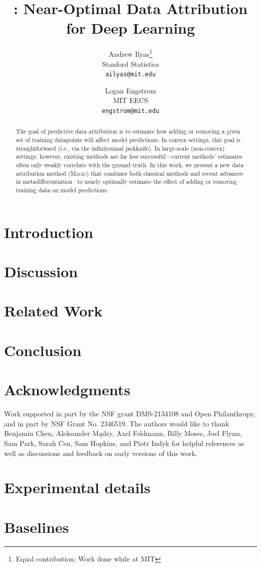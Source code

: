 \documentclass[11pt]{article}
\title{\method{}: Near-Optimal Data Attribution for Deep Learning}
\author{Andrew Ilyas\footnote{Equal contribution; Work done while at MIT} \\
  Stanford Statistics \\ 
  \texttt{ailyas@mit.edu} \and
  Logan Engstrom\footnotemark[1] \\
  MIT EECS \\
  \texttt{engstrom@mit.edu}
}
\date{}
\newcommand{\method}{\textsc{Magic}}
\begin{document}
\maketitle

\begin{abstract}
  The goal of predictive data attribution is to estimate how adding or removing
  a given set of training datapoints will affect model predictions.
  In convex settings, this goal is straightforward (i.e., via the infinitesimal
  jackknife).
  In large-scale (non-convex) settings, however, existing methods are far less
  successful---current methods' estimates often only weakly
  correlate with the ground truth.
  In this work, we present a new data attribution
  method (\method{}) that combines both classical methods and recent advances in
  metadifferentiation~\citep{engstrom2025optimizing} to nearly optimally
  estimate the effect of adding or removing training data on model predictions.
\end{abstract}

\section{Introduction}







\section{Discussion}
\label{sec:discussion}


\section{Related Work}


\section{Conclusion}


\section{Acknowledgments}
Work supported in part by the NSF grant DMS-2134108 and Open Philanthropy, and
in part by NSF Grant No. 2346519. The authors would like to thank Benjamin
Chen, Aleksander M\k{a}dry, Axel Feldmann, Billy Moses, Joel Flynn, Sam Park,
Sarah Cen, Sam Hopkins, and Piotr Indyk for helpful references as well as
discussions and feedback on early versions of this work.

\printbibliography

\clearpage
\appendix

\section{Experimental details}
\label{app:expdetails}


\section{Baselines}
\label{app:baselines}

\end{document}
